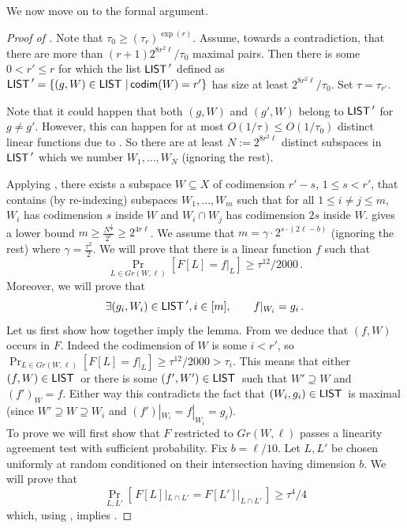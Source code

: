 \documentclass{toc}
\newcommand\Set[2]{ \left\{ #1 \,  \vert  \, #2\right\} }
\newcommand*\codimm{{\sf codim}}
\renewcommand\geq{\geqslant}
\renewcommand\ge{\geqslant}
\renewcommand\leq{\leqslant}
\renewcommand\le{\leqslant}
\renewcommand\subset{\subseteq}
\renewcommand\supset{\supseteq}
\def\M{{\sf LIST\,}}
\begin{document}
We now move on to the formal argument.
\begin{proof}[Proof of ] Note that
%
$\tau_0 \ge (\tau_r)^{\exp(r)}$.    %
Assume, towards a contradiction, that there are more than $(r+1)2^{8r^2\ell}/\tau_0$ maximal pairs.
Then there is some $0< r'\le r$ for which the list $\M'$ defined as $\M' = \Set{(g,W)\in \M }{ \codimm(W)=r'}$ has size at least $2^{8r^2\ell}/\tau_0$. Set $\tau = \tau_{r'}$.

Note that it could happen that both $(g,W)$ and $(g',W)$ belong to $\M'$ for $g\neq g'$. However, this can happen for at most $O(1/\tau) \le O(1/\tau_0)$ distinct linear functions due to . So there are at least $N:=2^{8r^2\ell}$ distinct subspaces in $\M'$ which we number $W_1,\ldots,W_N$ (ignoring the rest).
%

Applying , there exists a subspace $W\subset X$ of codimension $r'-s$, $1\leq s <r'$, that contains (by re-indexing) subspaces
$W_1, \ldots, W_m$ such that for all $1 \leq i\not=j \leq m$, $W_i$ has codimension
$s$ inside $W$ and $W_i \cap W_j$ has codimension $2s$ inside $W$.
 gives a lower bound
 $m \geq  \frac{N^{\frac{1}{r}}}{2^r} \geq 2^{4r \ell}$. We assume that $m = \gamma \cdot 2^{s \cdot (2\ell -b)}$ (ignoring the rest) where
 $\gamma = \frac{\tau^2}{2}$.
We will prove that there is a linear function $f$ such that
\begin{equation}\label{eq:globlin}
  \Pr_{L\in Gr(W,\ell)}[ F[L] = f|_L] \ge \tau^{12}/2000\,.
\end{equation}
Moreover, we will prove that
\begin{equation}\label{eq:moreover}
\exists (g_i,W_i)\in \M', i\in [m],\qquad f|_{W_i} = g_i\,.
\end{equation}
Let us first show how %
together imply the lemma. From  we deduce that
$(f,W)$ occurs in $F$. Indeed the codimension of $W$ is some
$i < r'$, so
$ \Pr_{L\in Gr(W,\ell)}[ F[L] = f|_L] \ge \tau^{12}/2000
>\tau_i$. This means that either $(f,W) \in \M$ or there is some
$(f',W')\in \M$ such that $W'\supset W$ and $(f')_W=f$.
%
Either way this contradicts the fact that $(W_i,g_i) \in \M$ is maximal (since $W'\supset W\supset W_i$ and $(f')|_{W_i} = f|_{W_i} = g_i$).\\


To prove  we will first show that $F$ restricted to $Gr(W,\ell)$ passes a linearity agreement test with sufficient probability. Fix $b= \ell/10$. Let $L,L'$ be chosen uniformly at random conditioned on their intersection having dimension $b$. We will prove that
\begin{equation}\label{eq:local-agreement}
  \Pr_{L,L'}[ \, F[L]|_{L\cap L'} = F[L']|_{L\cap L'} \,] \ge \tau^4/4
\end{equation}
%
which, using , implies .


\end{proof}
\end{document}
